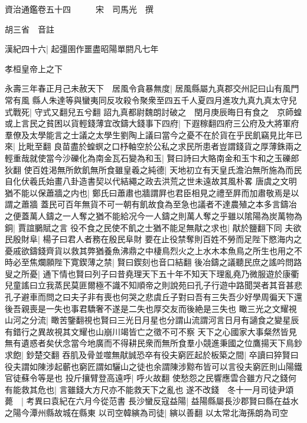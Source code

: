 資治通鑑卷五十四　　　宋　司馬光　撰

胡三省　音註

漢紀四十六|{
	起彊圉作噩盡昭陽單閼凡七年}


孝桓皇帝上之下

永壽三年春正月己未赦天下　居風令貪暴無度|{
	居風縣屬九真郡交州記曰山有風門常有風}
縣人朱達等與蠻夷同反攻殺令聚衆至四五千人夏四月進攻九真九真太守兒式戰死|{
	守式又翻兒五兮翻}
詔九真都尉魏朗討破之　閏月庚辰晦日有食之　京師蝗　或上言民之貧困以貨輕錢薄宜改鑄大錢事下四府|{
	下遐稼翻四府三公府及大將軍府}
羣僚及太學能言之士議之太學生劉陶上議曰當今之憂不在於貨在乎民飢竊見比年已來|{
	比毗至翻}
良苗盡於蝗螟之口杼軸空於公私之求民所患者豈謂錢貨之厚薄銖兩之輕重哉就使當今沙礫化為南金瓦石變為和玉|{
	賢曰詩曰大賂南金和玉卞和之玉礫郎狄翻}
使百姓渇無所飲飢無所食雖皇羲之純德|{
	天地初立有天皇氏澹泊無所施為而民自化伏羲氏始畫八卦造書契以代結繩之政去洪荒之世未遠故其風朴畧}
唐虞之文明猶不能以保蕭牆之内也|{
	鄭氏曰蕭肅也牆謂屛也君臣相見之禮至屛而加肅敬焉是以謂之蕭牆}
蓋民可百年無貨不可一朝有飢故食為至急也議者不達農殖之本多言鑄冶之便蓋萬人鑄之一人奪之猶不能給况今一人鑄之則萬人奪之乎雖以隂陽為炭萬物為銅|{
	賈誼鵩賦之言}
役不食之民使不飢之士猶不能足無猒之求也|{
	猒於鹽翻下同}
夫欲民殷財阜|{
	楊子曰君人者務在殷民阜財}
要在止役禁奪則百姓不勞而足陛下愍海内之憂戚欲鑄錢齊貨以救其弊猶養魚沸鼎之中棲鳥烈火之上水木本魚鳥之所生也用之不時必至焦爛願陛下寛鍥薄之禁|{
	賢曰鍥刻也音口結翻}
後冶鑄之議聽民庶之謠吟問路叟之所憂|{
	通下情也賢曰列子曰昔堯理天下五十年不知天下理亂堯乃微服遊於康衢兒童謠曰立我蒸民莫匪爾極不識不知順帝之則說苑曰孔子行遊中路聞哭者其音甚悲孔子避車而問之曰夫子非有喪也何哭之悲虞丘子對曰吾有三失吾少好學周徧天下還後吾親喪是一失也事君驕奢不遂是二失也厚交友而後絶是三失也}
瞰三光之文耀視山河之分流|{
	瞰苦鑒翻視也賢曰三光日月星也分謂山流謂河言日月有讁食之變星辰有錯行之異故視其文耀也山崩川竭皆亡之徵不可不察}
天下之心國家大事粲然皆見無有遺惑者矣伏念當今地廣而不得耕民衆而無所食羣小競進秉國之位鷹揚天下鳥鈔求飽|{
	鈔楚交翻}
吞肌及骨並噬無猒誠恐卒有役夫窮匠起於板築之間|{
	卒讀曰猝賢曰役夫謂如陳涉起蘄也窮匠謂如驪山之徒也余謂陳涉黥布皆可以言役夫窮匠則山陽鐵官徒蘇令等是也}
投斤攘臂登高遠呼|{
	呼火故翻}
使愁怨之民響應雲合雖方尺之錢何有能救其危也|{
	言雖錢大方尺亦不能救天下之亂也}
遂不改錢　冬十一月司徒尹頌薨　|{
	考異曰袁紀在六月今從范書}
長沙蠻反寇益陽|{
	益陽縣屬長沙郡賢曰縣在益水之陽今潭州縣故城在縣東}
以司空韓縯為司徒|{
	縯以善翻}
以太常北海孫朗為司空

